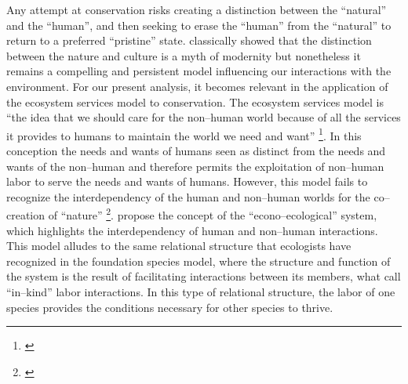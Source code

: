 \documentclass{article}
\begin{document}
{Any attempt at conservation risks creating a distinction between the ``natural'' and the ``human'', and then seeking to erase the ``human'' from the ``natural'' to return to a preferred ``pristine'' state. \citeauthor{latour_we_1993} classically showed that the distinction between the nature and culture is a myth of modernity but nonetheless it remains a compelling and persistent model influencing our interactions with the environment. For our present analysis, it becomes relevant in the application of the ecosystem services model to conservation. The ecosystem services model is ``the idea that we should care for the non--human world because of all the services it provides to humans to maintain the world we need and want'' \footnote{\cite{gibson-graham_non-human_2020}}. In this conception the needs and wants of humans seen as distinct from the needs and wants of the non--human and therefore permits the exploitation of non--human labor to serve the needs and wants of humans. However, this model fails to recognize the interdependency of the human and non--human worlds for the co--creation of ``nature'' \footnote{\cite{gibson-graham_non-human_2020, richardson_resource_2014, krz_nonhuman_2020}}. \citeauthor{gibson-graham_non-human_2020} propose the concept of the ``econo--ecological'' system, which highlights the interdependency of human and non--human interactions. This model alludes to the same relational structure that ecologists have recognized in the foundation species model, where the structure and function of the system is the result of facilitating interactions between its members, what \citeauthor{gibson-graham_non-human_2020} call ``in--kind'' labor interactions. In this type of relational structure, the labor of one species provides the conditions necessary for other species to thrive. 

}
\end{document}
